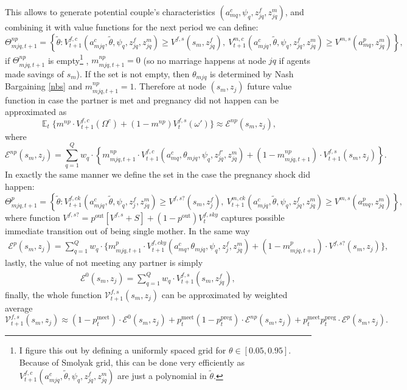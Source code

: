 \documentclass[12pt,letter]{article}
\DeclareMathOperator{\E}{\mathbb{E}}
\begin{document}
This allows to generate potential couple's characteristics $(a^c_{mq},\psi_q,z^{f}_{jq},z^{m}_{jq})$, and combining it with value functions for the next period we can define:
\[\Theta^{np}_{mjq,t+1} = \left\{ \tilde\theta : V^{f,c}_{t+1}(a^c_{mjq}, \tilde\theta, \psi_q,z^{f}_{jq},z^{m}_{jq}) \geq V^{f,s}(s_m,z^f_{jq}), \ V^{m,c}_{t+1}(a^c_{mjq}, \tilde\theta, \psi_q,z^{f}_{jq},z^{m}_{jq}) \geq V^{m,s}(a^p_{mq},z^m_{jq}) \right\},\]
if $\Theta^{np}_{mjq,t+1}$ is empty\footnote{I figure this out by defining a uniformly spaced grid for $\theta \in [0.05,0.95]$. Because of Smolyak grid, this can be done very efficiently as $V^{f,c}_{t+1}(a^c_{mjq}, \tilde\theta, \psi_q,z^{f}_{jq},z^{m}_{jq})$ are just a polynomial in $\tilde{\theta}$.}
, $m^{np}_{mjq,t+1} = 0$ (so no marriage happens at node $jq$ if agents made savings of $s_m$). If the set is not empty, then $\theta_{mjq}$ is determined by Nash Bargaining \ref{nbs} and $m^{np}_{mjq,t+1} = 1$. Therefore at node $(s_m,z_j)$ future value function in case the partner is met and pregnancy did not happen can be approximated as
\[\E_t  \big\{ m^{np} \cdot V^{f,c}_{t+1}(\Omega^c) + (1-m^{np})V^{f,s}_t(\omega')\big\} \approx \mathcal{E}^{np}(s_m,z_j),\]
where
\[\mathcal{E}^{np}(s_m,z_j) = \sum\limits_{q=1}^{Q} w_q \cdot \left\{ m^{np}_{mjq,t+1}\cdot V^{f,c}_{t+1}(a^c_{mq},\theta_{mjq},\psi_q,z^{f\prime}_{jq},z^m_{jq}) + (1-m^{np}_{mjq,t+1})\cdot V^{f,s}_{t+1}(s_m,z_j)\right\}.\]
In exactly the same manner we define the set in the case the pregnancy shock did happen:
\[\Theta^{p}_{mjq,t+1} = \left\{ \tilde\theta : V^{f,ck}_{t+1}(a^c_{mjq}, \tilde\theta, \psi_q,z^{f}_j,z^{m}_{jq}) \geq V^{f,s?}(s_m,z^f_{j}), \ V^{m,ck}_{t+1}(a^c_{mjq}, \tilde\theta, \psi_q,z^{f}_{jq},z^{m}_{jq}) \geq V^{m,s}(a^p_{mq},z^m_{jq}) \right\},\]
where function $V^{f,s?} = p^{\text{out}}[V^{f,s} + S] + (1-p^{\text{out}})V^{f,sky}_t$ captures possible immediate transition out of being single mother. In the same way 
\begin{align*}\mathcal{E}^{p}(s_m,z_j) = \sum\limits_{q=1}^{Q} w_q \cdot  \Big\{ m^{p}_{mjq,t+1}\cdot V^{f,cky}_{t+1}(a^c_{mq},\theta_{mjq},\psi_q,z^f_j,z^m_{jq}) + (1-m^{p}_{mjq,t+1})\cdot V^{f,s?}(s_m,z_j) \Big\},
\end{align*}
lastly, the value of not meeting any partner is simply
\begin{align*}\mathcal{E}^{0}(s_m,z_j) = \sum\limits_{q=1}^{Q} w_q \cdot  V^{f,s}_{t+1}(s_m,z^f_{jq}),
\end{align*}
finally, the whole function $\mathcal{V}^{f,s}_{t+1}(s_m,z_j)$ can be approximated by weighted average
\[\mathcal{V}^{f,s}_{t+1}(s_m,z_j) \approx (1-p^{\text{meet}}_t) \cdot \mathcal{E}^{0}(s_m,z_j) +  p^{\text{meet}}_t(1-p^{\text{preg}}_t)  \cdot \mathcal{E}^{np}(s_m,z_j) 
+  p^{\text{meet}}_t p^{\text{preg}}_t  \cdot \mathcal{E}^{p}(s_m,z_j).\]
\end{document}

